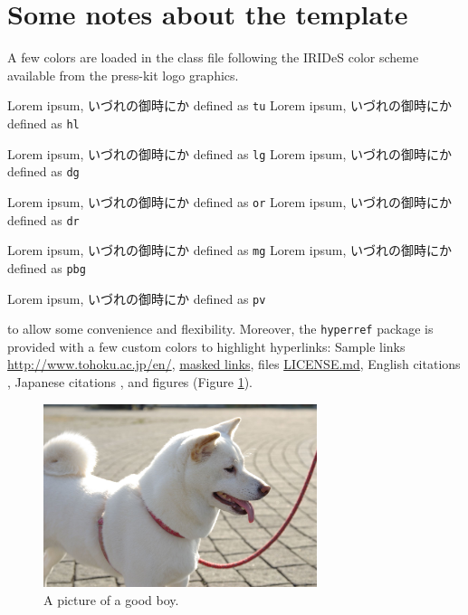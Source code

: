 \documentclass[a4paper,11pt]{TUmemorandum}
\begin{document}
\maketitle
\pagestyle{plain}
\section*{Some notes about the template}
%
A few colors are loaded in the class file following the IRIDeS color scheme available from the press-kit logo graphics.\par
\noindent \textcolor{tu}{Lorem ipsum, いづれの御時にか} defined as \verb+tu+
\textcolor{hl}{Lorem ipsum, いづれの御時にか} defined as \verb+hl+ \par
\noindent \textcolor{lg}{Lorem ipsum, いづれの御時にか} defined as \verb+lg+
\textcolor{dg}{Lorem ipsum, いづれの御時にか} defined as \verb+dg+ \par
\noindent \textcolor{or}{Lorem ipsum, いづれの御時にか} defined as \verb+or+
\textcolor{dr}{Lorem ipsum, いづれの御時にか} defined as \verb+dr+ \par
\noindent \textcolor{mg}{Lorem ipsum, いづれの御時にか} defined as \verb+mg+
\textcolor{pbg}{Lorem ipsum, いづれの御時にか} defined as \verb+pbg+ \par
\noindent \textcolor{pv}{Lorem ipsum, いづれの御時にか} defined as \verb+pv+ \par
\noindent to allow some convenience and flexibility. Moreover, the \verb+hyperref+ package is provided with a few custom colors to highlight hyperlinks:
Sample links \url{http://www.tohoku.ac.jp/en/}, \href{https://www.tohoku.ac.jp/japanese/}{masked links}, files \href{run:./LICENSE.md}{LICENSE.md}, English citations \cite{Koshimura2009a}, Japanese citations \cite{里美2013}, and figures (Figure \ref{fig:doggo}).
\begin{figure}[h]
\centering
\includegraphics[width=8cm]{shiba.jpg}
\caption{A picture of a good boy.}
\label{fig:doggo}
\end{figure}
%
\end{document}
